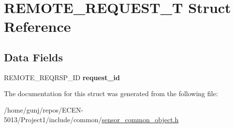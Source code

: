 \hypertarget{structREMOTE__REQUEST__T}{}\section{R\+E\+M\+O\+T\+E\+\_\+\+R\+E\+Q\+U\+E\+S\+T\+\_\+T Struct Reference}
\label{structREMOTE__REQUEST__T}
\subsection*{Data Fields}
\begin{DoxyCompactItemize}
\item 
R\+E\+M\+O\+T\+E\+\_\+\+R\+E\+Q\+R\+S\+P\+\_\+\+ID {\bfseries request\+\_\+id}\hypertarget{structREMOTE__REQUEST__T_aa9abf86717ba38441b7620ce1a435379}{}\label{structREMOTE__REQUEST__T_aa9abf86717ba38441b7620ce1a435379}

\end{DoxyCompactItemize}


The documentation for this struct was generated from the following file\+:\begin{DoxyCompactItemize}
\item 
/home/gunj/repos/\+E\+C\+E\+N-\/5013/\+Project1/include/common/\hyperlink{sensor__common__object_8h}{sensor\+\_\+common\+\_\+object.\+h}\end{DoxyCompactItemize}
